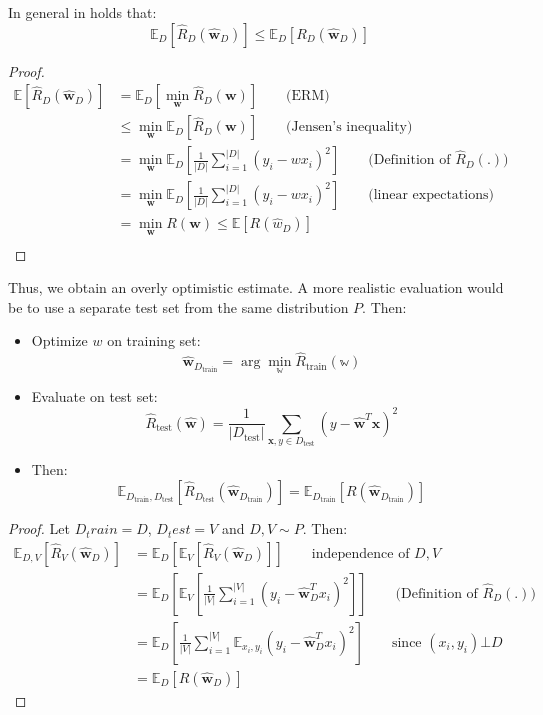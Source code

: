 \documentclass[a4paper,10pt,twoside]{article}
\begin{document}
In general in holds that:
\begin{equation*}
    \mathbb{E}_D[\hat{R}_D(\hat{\mathbf{w}}_D)]\leq\mathbb{E}_D[R_D(\hat{\mathbf{w}}_D)]
\end{equation*}
\begin{proof}[Proof]
    \begin{align*}
        \mathbb{E}[\hat{R}_D(\hat{\mathbf{w}}_D)] &= \mathbb{E}_D[\min_{\mathbf{w}}\hat{R}_D(\mathbf{w})]\qquad\text{(ERM)}\\
        &\leq \min_{\mathbf{w}}\mathbb{E}_D[\hat{R}_D(\mathbf{w})]\qquad\text{(Jensen's inequality)}\\
        &= \min_{\mathbf{w}}\mathbb{E}_D[\frac{1}{|D|}\sum_{i=1}^{|D|}(y_i-wx_i)^2]\qquad\text{(Definition of $\hat{R}_D(.)$)}\\
        &= \min_{\mathbf{w}}\mathbb{E}_D[\frac{1}{|D|}\sum_{i=1}^{|D|}(y_i-wx_i)^2]\qquad\text{(linear expectations)}\\
        &= \min_{\mathbf{w}}R(\mathbf{w})\leq\mathbb{E}[R(\hat{w}_D)]\\
    \end{align*}
\end{proof}
Thus, we obtain an overly optimistic estimate. A more realistic evaluation would be to use a separate test set from the same distribution $P$. Then:
\begin{itemize}
    \item Optimize $w$ on training set:
    \begin{equation*}
        \mathbf{\hat{w}}_{D_{\text{train}}} = \arg\min_{\mathbb{w}} \hat{R}_{\text{train}}(\mathbb{w})
    \end{equation*}
    \item Evaluate on test set:
    \begin{equation*}
        \hat{R}_{\text{test}}(\mathbf{\hat{w}})=\frac{1}{|D_{\text{test}}|}\sum_{\mathbf{x},y\in D_{\text{test}}}^{}(y-\hat{\mathbf{w}}^T\mathbf{x})^2
    \end{equation*}
    \item Then:
    \begin{equation*}
        \mathbb{E}_{D_{\text{train}}, D_{\text{test}}}[\hat{R}_{D_{\text{test}}}(\hat{\mathbf{w}}_{D_{\text{train}}})]=\mathbb{E}_{D_{\text{train}}}[R(\mathbf{\hat{w}}_{D_{\text{train}}})]
    \end{equation*}
\end{itemize}
\begin{proof}[Proof]
    Let $D_train=D$, $D_test=V$ and $D,V\sim P$. Then:
    \begin{align*}
        \mathbb{E}_{D,V}[\hat{R}_V(\hat{\mathbf{w}}_D)] &= \mathbb{E}_D[\mathbb{E}_V[\hat{R}_V(\hat{\mathbf{w}}_D)]]\qquad\text{independence of $D,V$}\\
        &=\mathbb{E}_D[\mathbb{E}_V[\frac{1}{|V|}\sum_{i=1}^{|V|}(y_i-\hat{\mathbf{w}}_D^Tx_i)^2]]\qquad\text{(Definition of $\hat{R}_D(.)$)}\\
        &=\mathbb{E}_D[\frac{1}{|V|}\sum_{i=1}^{|V|}\mathbb{E}_{x_i, y_i}(y_i-\hat{\mathbf{w}}_D^Tx_i)^2]\qquad\text{since $(x_i,y_i)\bot D$}\\
        &=\mathbb{E}_D[R(\mathbf{\hat{w}}_D)]   
    \end{align*}
\end{proof}
\end{document}
